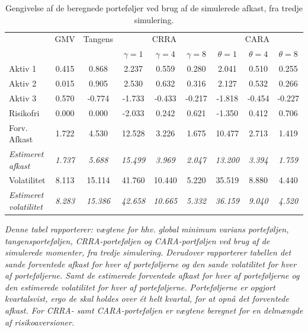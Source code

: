 \documentclass[
  a4paper,
  oneside]{memoir}
\begin{document}
\begin{table}[H]

\caption{\label{tab:sum-3}Gengivelse af de beregnede porteføljer ved brug af de simulerede afkast, fra tredje simulering.}
\centering
\begin{threeparttable}
\begin{tabular}[t]{lcccccccc}
\toprule
\multicolumn{1}{c}{ } & \multicolumn{1}{c}{GMV} & \multicolumn{1}{c}{Tangens} & \multicolumn{3}{c}{CRRA} & \multicolumn{3}{c}{CARA} \\
\cmidrule(l{3pt}r{3pt}){2-2} \cmidrule(l{3pt}r{3pt}){3-3} \cmidrule(l{3pt}r{3pt}){4-6} \cmidrule(l{3pt}r{3pt}){7-9}
  &   &   & $\gamma=1$ & $\gamma=4$ & $\gamma=8$ & $\theta=1$ & $\theta=4$ & $\theta=8$\\
\midrule
\rowcolor{gray!6}  Aktiv 1 & 0.415 & 0.868 & 2.237 & 0.559 & 0.280 & 2.041 & 0.510 & 0.255\\
Aktiv 2 & 0.015 & 0.905 & 2.530 & 0.632 & 0.316 & 2.127 & 0.532 & 0.266\\
\rowcolor{gray!6}  Aktiv 3 & 0.570 & -0.774 & -1.733 & -0.433 & -0.217 & -1.818 & -0.454 & -0.227\\
Risikofri & 0.000 & 0.000 & -2.033 & 0.242 & 0.621 & -1.350 & 0.412 & 0.706\\
\rowcolor{gray!6}  Forv. Afkast & 1.722 & 4.530 & 12.528 & 3.226 & 1.675 & 10.477 & 2.713 & 1.419\\
\em{Estimeret afkast} & \em{1.737} & \em{5.688} & \em{15.499} & \em{3.969} & \em{2.047} & \em{13.200} & \em{3.394} & \em{1.759}\\
\rowcolor{gray!6}  Volatilitet & 8.113 & 15.114 & 41.760 & 10.440 & 5.220 & 35.519 & 8.880 & 4.440\\
\em{Estimeret volatilitet} & \em{8.283} & \em{15.386} & \em{42.658} & \em{10.665} & \em{5.332} & \em{36.159} & \em{9.040} & \em{4.520}\\
\bottomrule
\end{tabular}
\begin{tablenotes}
\item \textit{Denne tabel rapporterer: vægtene for hhv. global minimum varians porteføljen, tangensporteføljen, CRRA-porteføljen og CARA-portføljen ved brug af de simulerede momenter, fra tredje simulering. Derudover rapporterer tabellen det sande forventede afkast for hver af porteføljerne og den sande volatilitet for hver af porteføljerne. Samt de estimerede forventede afkast for hver af porteføljerne og den estimerede volatilitet for hver af porteføljerne. Porteføljerne er opgjort kvartalsvist, ergo de skal holdes over ét helt kvartal, for at opnå det forventede afkast. For CRRA- samt CARA-porteføljen er vægtene beregnet for en delmængde af risikoaversioner.}
\end{tablenotes}
\end{threeparttable}
\end{table}
\end{document}
